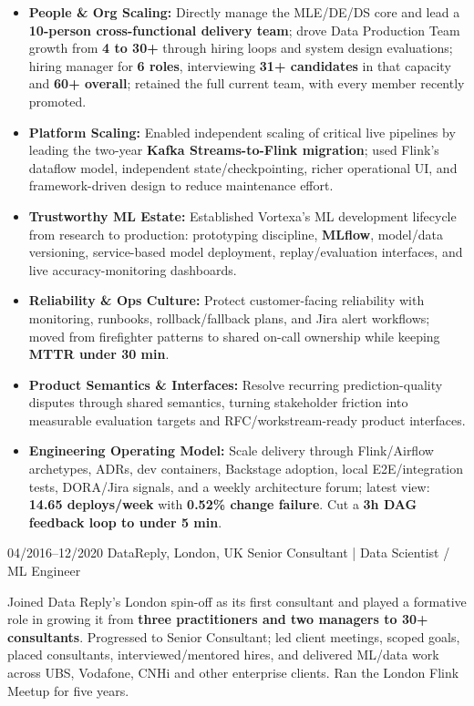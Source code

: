 \documentclass[]{../../friggeri-cv}
\begin{document}
\begin{entrylist}
{{    	}
	    \begin{itemize}[leftmargin=1.1em]
										        \item \footnotesize\textbf{People \& Org Scaling:} Directly manage the MLE/DE/DS core and lead a \textbf{10-person cross-functional delivery team}; drove Data Production Team growth from \textbf{4 to 30+} through hiring loops and system design evaluations; hiring manager for \textbf{6 roles}, interviewing \textbf{31+ candidates} in that capacity and \textbf{60+ overall}; retained the full current team, with every member recently promoted.
									        \item \footnotesize\textbf{Platform Scaling:} Enabled independent scaling of critical live pipelines by leading the two-year \textbf{Kafka Streams-to-Flink migration}; used Flink's dataflow model, independent state/checkpointing, richer operational UI, and framework-driven design to reduce maintenance effort.
									        \item \footnotesize\textbf{Trustworthy ML Estate:} Established Vortexa's ML development lifecycle from research to production: prototyping discipline, \textbf{MLflow}, model/data versioning, service-based model deployment, replay/evaluation interfaces, and live accuracy-monitoring dashboards.
									        \item \footnotesize\textbf{Reliability \& Ops Culture:} Protect customer-facing reliability with monitoring, runbooks, rollback/fallback plans, and Jira alert workflows; moved from firefighter patterns to shared on-call ownership while keeping \textbf{MTTR under 30 min}.
									        \item \footnotesize\textbf{Product Semantics \& Interfaces:} Resolve recurring prediction-quality disputes through shared semantics, turning stakeholder friction into measurable evaluation targets and RFC/workstream-ready product interfaces.
									        \item \footnotesize\textbf{Engineering Operating Model:} Scale delivery through Flink/Airflow archetypes, ADRs, dev containers, Backstage adoption, local E2E/integration tests, DORA/Jira signals, and a weekly architecture forum; latest view: \textbf{14.65 deploys/week} with \textbf{0.52\% change failure}. Cut a \textbf{3h DAG feedback loop to under 5 min}.
    	\end{itemize}
	}
    \entry
    {04/2016–12/2020}
    {DataReply, London, UK}
    {Senior Consultant | Data Scientist / ML Engineer}
    {
        {\small
        \setlength{\parindent}{0pt}
        \setlength{\leftskip}{0pt}
					        Joined Data Reply's London spin-off as its first consultant and played a formative role in growing it from \textbf{three practitioners and two managers to 30+ consultants}. Progressed to Senior Consultant; led client meetings, scoped goals, placed consultants, interviewed/mentored hires, and delivered ML/data work across UBS, Vodafone, CNHi and other enterprise clients. Ran the London Flink Meetup for five years.

}}
\end{entrylist}
\end{document}
